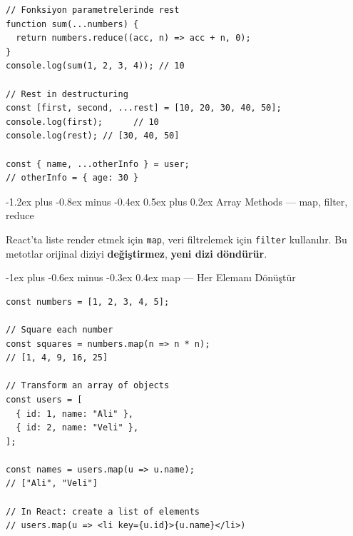 \documentclass[12pt, a4paper]{article}
\makeatletter
\renewcommand{\subsection}{%
  \@startsection{subsection}{2}{\z@}%
    {-1.2ex plus -0.8ex minus -0.4ex}%
    {0.5ex plus 0.2ex}%
    {\normalfont\large\bfseries\sffamily\color{secondary}}%
}
\renewcommand{\subsubsection}{%
  \@startsection{subsubsection}{3}{\z@}%
    {-1ex plus -0.6ex minus -0.3ex}%
    {0.4ex}%
    {\normalfont\normalsize\bfseries\sffamily\color{accent}}%
}
\makeatother
\begin{document}
\begin{tcolorbox}[enhanced, colback=codebg, colframe=gray!30,
    colbacktitle=primary!85!black, coltitle=white, arc=4pt,
    title={\sffamily\bfseries\small Rest — Kalan Parametreleri Topla}]
\begin{lstlisting}[style=jsstyle]
// Fonksiyon parametrelerinde rest
function sum(...numbers) {
  return numbers.reduce((acc, n) => acc + n, 0);
}
console.log(sum(1, 2, 3, 4)); // 10

// Rest in destructuring
const [first, second, ...rest] = [10, 20, 30, 40, 50];
console.log(first);      // 10
console.log(rest); // [30, 40, 50]

const { name, ...otherInfo } = user;
// otherInfo = { age: 30 }
\end{lstlisting}
\end{tcolorbox}

\newpage
\subsection{Array Methods — map, filter, reduce}

\begin{definebox}
React'ta liste render etmek için \texttt{map}, veri filtrelemek için
\texttt{filter} kullanılır. Bu metotlar orijinal diziyi \textbf{değiştirmez},
\textbf{yeni dizi döndürür}.
\end{definebox}

\vspace{8pt}

\subsubsection{map — Her Elemanı Dönüştür}

\begin{tcolorbox}[enhanced, colback=codebg, colframe=gray!30,
    colbacktitle=primary!85!black, coltitle=white, arc=4pt,
    title={\sffamily\bfseries\small map Örnekleri}]
\begin{lstlisting}[style=jsstyle]
const numbers = [1, 2, 3, 4, 5];

// Square each number
const squares = numbers.map(n => n * n);
// [1, 4, 9, 16, 25]

// Transform an array of objects
const users = [
  { id: 1, name: "Ali" },
  { id: 2, name: "Veli" },
];

const names = users.map(u => u.name);
// ["Ali", "Veli"]

// In React: create a list of elements
// users.map(u => <li key={u.id}>{u.name}</li>)
\end{lstlisting}
\end{tcolorbox}
\end{document}
